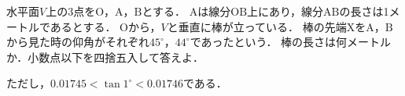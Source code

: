 \documentclass[../../main.tex]{subfiles}
\begin{document}
水平面$V$上の$3$点を$\mathrm{O}$，$\mathrm{A}$，$\mathrm{B}$とする．
$\mathrm{A}$は線分$\mathrm{OB}$上にあり，線分$\mathrm{AB}$の長さは1メートルであるとする．
$\mathrm{O}$から，$V$と垂直に棒が立っている．
棒の先端$\mathrm{X}$を$\mathrm{A}$，$\mathrm{B}$から見た時の仰角がそれぞれ$45^{\circ}$，$44^{\circ}$であったという．
棒の長さは何メートルか．小数点以下を四捨五入して答えよ．

ただし，$0.01745<\tan 1^{\circ} < 0.01746$である．
\end{document}
